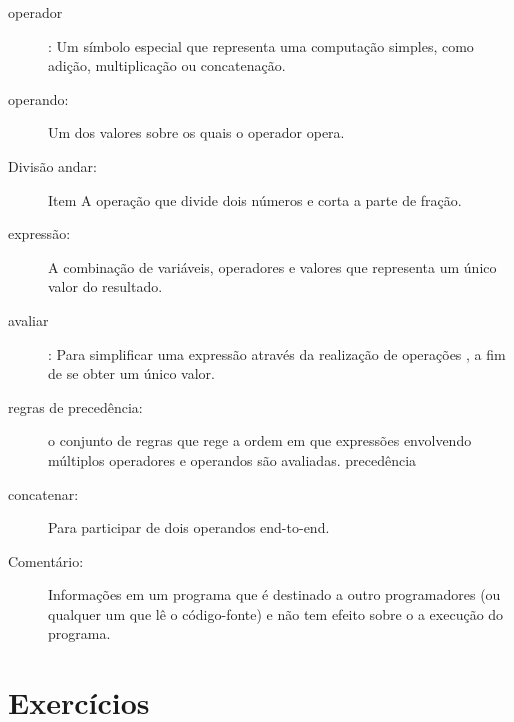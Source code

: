 \documentclass[10pt]{book}
\begin{document}
\begin{description}
\item[operador]: Um símbolo especial que representa uma computação simples, como
adição, multiplicação ou concatenação.

\item[operando:] Um dos valores sobre os quais o operador opera.

\item[Divisão andar:] Item A operação que divide dois números e corta
a parte de fração.

\item[expressão:] A combinação de variáveis, operadores e valores que
representa um único valor do resultado.

\item[avaliar]: Para simplificar uma expressão através da realização de operações
, a fim de se obter um único valor.

\item[regras de precedência:] o conjunto de regras que rege a ordem em que
expressões envolvendo múltiplos operadores e operandos são avaliadas.
\index{} precedência

\item[concatenar:] Para participar de dois operandos end-to-end.

\item[Comentário:] Informações em um programa que é destinado a outro
programadores (ou qualquer um que lê o código-fonte) e não tem efeito sobre o
a execução do programa.

\end{description}


\section{Exercícios}
\end{document}

